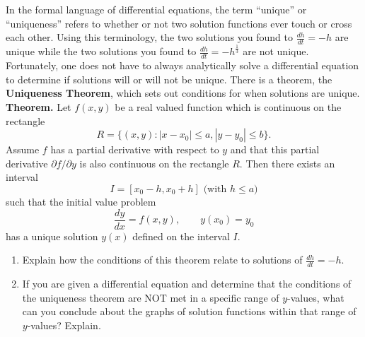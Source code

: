 \clearpage


In the formal language of differential equations, the term ``unique'' or ``uniqueness'' refers to whether or not two solution functions ever touch or cross each other. Using this terminology, the two solutions you found to $\displaystyle\frac{dh}{dt}=-h$ are unique while the two solutions you found to $\displaystyle\frac{dh}{dt}=-h^{\frac{1}{3}}$ are not unique. Fortunately, one does not have to always analytically solve a differential equation to determine if solutions will or will not be unique. There is a theorem, the \textbf{Uniqueness Theorem}, which sets out conditions for when solutions are unique. \\

\textbf{Theorem.} Let $f(x,y)$ be a real valued function which is continuous on the rectangle 
\[R=\{(x,y):|x-x_0 |\leq a,|y-y_0 |\leq b\}.\]
Assume $f$ has a partial derivative with respect to $y$ and that this partial derivative $\partial f/\partial y$ is also continuous on the rectangle $R$. Then there exists an interval 
\[I = [x_0 - h, x_0 + h] \text{ (with $h \leq a$)}\]
such that the initial value problem 
\[ \frac{dy}{dx}=f(x,y), \qquad y(x_0)=y_0\]
has a unique solution $y(x)$ defined on the interval $I$.
\vspace{.25in}

\begin{enumerate}[resume]
\item	Explain how the conditions of this theorem relate to solutions of $\displaystyle\frac{dh}{dt}=-h$. \label{05problem7}
\vfill

\item	If you are given a differential equation and determine that the conditions of the uniqueness theorem are NOT met in a specific range of $y$-values, what can you conclude about the graphs of solution functions within that range of $y$-values? Explain. \label{05problem8}
\vfill
\end{enumerate}

\clearpage


